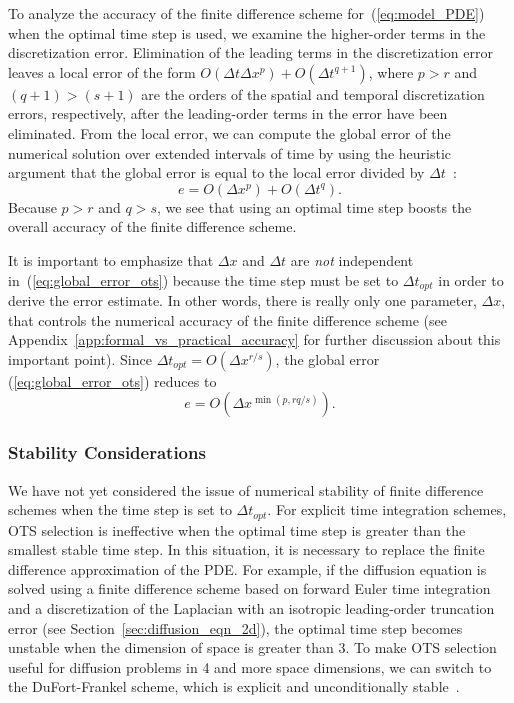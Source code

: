 \documentclass[fleqn,12pt,twoside]{article}
\newcommand{\beq}{\begin{equation}}
\newcommand{\eeq}{\end{equation}}
\def\dt{\Delta t}
\def\dx{\Delta x}
\def\dto{\dt_{opt}}
\begin{document}
To analyze the accuracy of the finite difference scheme 
for~(\ref{eq:model_PDE}) when the optimal time step is used, we examine the 
higher-order terms in the discretization error.  Elimination of the leading 
terms in the discretization error leaves a local error of the form 
$O(\dt \dx^p) + O(\dt^{q+1})$, where $p>r$ and $(q+1) > (s+1)$ are the orders 
of the spatial and temporal discretization errors, respectively, after the 
leading-order terms in the error have been eliminated.  
From the local error, we can compute the global error of the numerical 
solution over extended intervals of time by using the heuristic 
argument that the global error is equal to the local error divided by 
$\dt$~\cite{gko_book}:
\beq
e = O(\dx^p) + O(\dt^q).
\label{eq:global_error_ots}
\eeq
Because $p > r$ and $q > s$, we see that using an optimal time step 
boosts the overall accuracy of the finite difference scheme.

It is important to emphasize that $\dx$ and $\dt$ are \emph{not} independent 
in~(\ref{eq:global_error_ots}) because the time step must be set to $\dto$ 
in order to derive the error estimate.  In other words, there is really only 
one parameter, $\dx$, that controls the numerical accuracy of the finite 
difference scheme (see Appendix~\ref{app:formal_vs_practical_accuracy} for 
further discussion about this important point).  Since $\dto = O(\dx^{r/s})$, 
the global error (\ref{eq:global_error_ots}) reduces to
\beq
e = O \left( \dx^{\min(p,rq/s)} \right).
\label{eq:global_error_ots_simplified}
\eeq


\subsubsection*{Stability Considerations}
We have not yet considered the issue of numerical stability of finite
difference schemes when the time step is set to $\dto$.  For explicit time 
integration schemes, OTS selection is ineffective when the optimal time step 
is greater than the smallest stable time step.  In this situation, it is 
necessary to replace the finite difference approximation of the PDE.  
For example, if the diffusion equation is solved using a 
finite difference scheme based on forward Euler time integration and a 
discretization of the Laplacian with an isotropic leading-order truncation 
error (see Section~\ref{sec:diffusion_eqn_2d}), the optimal time step becomes 
unstable when the dimension of space is greater than 3.  To make OTS selection 
useful for diffusion problems in 4 and more space dimensions, we can switch 
to the DuFort-Frankel scheme, which is explicit and unconditionally 
stable~\cite{gko_book}.
\end{document}
